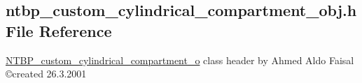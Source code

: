 \subsection{ntbp\_\-custom\_\-cylindrical\_\-compartment\_\-obj.h File Reference}
\label{ntbp__custom__cylindrical__compartment__obj_8h}



\begin{DoxyItemize}
\item \hyperlink{class_n_t_b_p__custom__cylindrical__compartment__o}{NTBP\_\-custom\_\-cylindrical\_\-compartment\_\-o} class header by Ahmed Aldo Faisal \copyright created 26.3.2001 
\end{DoxyItemize} 


